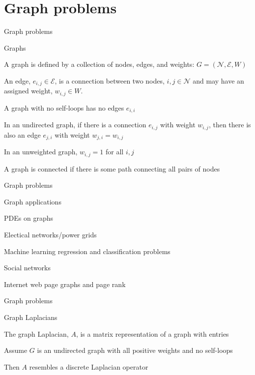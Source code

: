\documentclass[18pt,xcolor=table]{beamer}
\begin{document}

\section{Graph problems}

\begin{frame}{Graph problems}
\begin{block}{Graphs}
\bit
\item A graph is defined by a collection of nodes, edges, and weights: $G = (\mathcal{N},\mathcal{E},W)$
\item An edge, $e_{i,j}\in\mathcal{E}$, is a connection between two nodes, $i,j\in\mathcal{N}$ and may have an assigned weight, $w_{i,j}\in W$.
\item A graph with no self-loops has no edges $e_{i,i}$
\item In an undirected graph, if there is a connection $e_{i,j}$ with weight $w_{i,j}$, then there is also an edge $e_{j,i}$ with weight $w_{j,i} = w_{i,j}$
\item In an unweighted graph, $w_{i,j} = 1$ for all $i,j$
\item A graph is connected if there is some path connecting all pairs of nodes
\eit
\end{block}
\end{frame}

\begin{frame}{Graph problems}
\begin{block}{Graph applications}
\bit
\item PDEs on graphs
\item Electical networks/power grids
\item Machine learning regression and classification problems
\item Social networks
\item Internet web page graphs and page rank
\eit
\end{block}
\end{frame}

\begin{frame}{Graph problems}
\begin{block}{Graph Laplacians}
\bit
\item The graph Laplacian, $A$, is a matrix representation of a graph with entries
\item Assume $G$ is an undirected graph with all positive weights and no self-loops
\item Then $A$ resembles a discrete Laplacian operator 
\eit
\end{block}
\end{frame}
\end{document}
